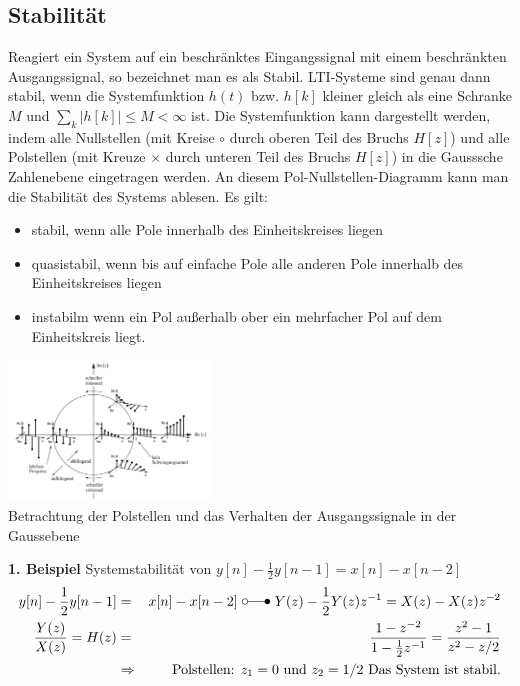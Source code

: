 \begin{multicols}{2}
\flushleft
\subsection{Stabilität}
Reagiert ein System auf ein beschränktes Eingangssignal mit einem beschränkten Ausgangssignal, so bezeichnet man es als Stabil. LTI-Systeme sind genau dann stabil, wenn die Systemfunktion $h(t)$ bzw. $h[k]$ kleiner gleich als eine Schranke $M$ und $\sum_k \vert h[k] \vert \leqslant M < \infty$ ist. Die Systemfunktion kann dargestellt werden, indem alle Nullstellen (mit Kreise $\circ$ durch oberen Teil des Bruchs $H[z]$) und alle Polstellen (mit Kreuze $\times$ durch unteren Teil des Bruchs $H[z]$) in die Gausssche Zahlenebene eingetragen werden. An diesem Pol-Nullstellen-Diagramm kann man die Stabilität des Systems ablesen. Es gilt:
\begin{itemize}
\item stabil, wenn alle Pole innerhalb des Einheitskreises liegen
\item quasistabil, wenn bis auf einfache Pole alle anderen Pole innerhalb des Einheitskreises liegen
\item instabilm wenn ein Pol außerhalb ober ein mehrfacher Pol auf dem Einheitskreis liegt.
\end{itemize}
\begin{center}
\includegraphics[width=0.4\textwidth]{img/Polstellen.jpg}\\
Betrachtung der Polstellen und das Verhalten der Ausgangssignale in der Gaussebene\\
\vspace{6pt}
\end{center}
\textbf{1. Beispiel} \quad Systemstabilität von $y[n] - \frac{1}{2}y[n-1]= x[n] - x[n-2]$
\begin{eqnarray*}
y[n] - \frac{1}{2}y[n-1] &=& x[n] - x[n-2] ~\laplace~ Y(z)- \frac{1}{2}Y(z)z^{-1} = X(z) - X(z)z^{-2}\\
\frac{Y(z)}{X(z)} = H(z) &=& \frac{1-z^{-2}}{1-\frac{1}{2}z^{-1}} = \frac{z^2-1}{z^2-z/2}\\
&\Rightarrow& \text{Polstellen: } z_1 = 0 \text{ und } z_2 = 1/2 \text{ Das System ist stabil.}

\end{eqnarray*}
\end{multicols}
